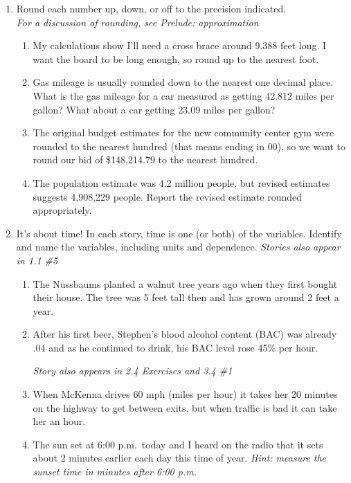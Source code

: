 \begin{enumerate}
\item  Round each number up, down, or off to the precision indicated. \\  \emph{For a discussion of rounding, see Prelude:  approximation}
\begin{enumerate}
\item My calculations show I'll need a cross brace around 9.388 feet long. I want the board to be long enough, so round up to the nearest foot. \vfill
\item  Gas mileage is usually rounded down to the nearest one decimal place.  What is the gas mileage for a car measured as getting 42.812 miles per gallon?  What about a car getting 23.09 miles per gallon? \vfill
\item  The original budget estimates for the new community center gym were rounded to the nearest hundred (that means ending in $00$), so we want to round our bid of \$148,214.79 to the nearest hundred.   \vfill
\item The population estimate was 4.2 million people, but revised estimates suggests 4,908,229 people.  Report the revised estimate rounded appropriately. \vfill
\end{enumerate}

\newpage %

\item  It's about time!  In each story, time is one (or both) of the variables.  Identify and name the variables, including units and dependence.  \hfill \emph{Stories also appear in 1.1 \#5}
\begin{enumerate}
\item The Nussbaums planted a walnut tree years ago when they first bought their house.  The tree was 5 feet tall then and has grown around 2 feet a year. \vfill
\item After his first beer, Stephen's blood alcohol content (BAC) was already .04 and as he continued to drink, his BAC level rose 45\% per hour. 

\hfill \emph{Story also appears in 2.4 Exercises and 3.4 \#1} 
 \vfill
\item When McKenna drives 60 mph (miles per hour) it takes her 20 minutes on the highway to get between exits, but when traffic is bad it can take her an hour.\vfill
\item The sun set at 6:00 p.m.\ today and I heard on the radio that it sets about 2 minutes earlier each day this time of year.  \emph{Hint: measure the sunset time in minutes after 6:00 p.m.}\vfill
\end{enumerate} 

\end{enumerate}

